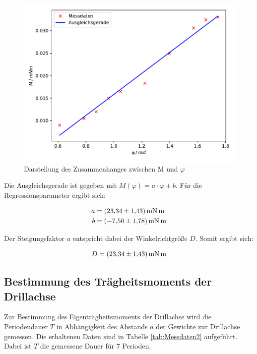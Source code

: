 \begin{figure}
  \centering
  \includegraphics[scale=0.8]{content/plot1.pdf}
  \caption{Darstellung des Zusammenhanges zwischen M und $\varphi$}
  \label{fig:plot1}
\end{figure}

Die Ausgleichsgerade ist gegeben mit $M(\varphi) = a\cdot \varphi + b$. Für die Regressionsparameter
ergibt sich: 

\begin{align*}
a &= \SI{23.34+-1.43}{\milli\newton\meter} \\
b &= \SI{-7.5+-1.78}{\milli\newton\meter}
\end{align*}

Der Steigungsfaktor $a$ entspricht dabei der Winkelrichtgröße $D$. Somit ergibt sich: 

\begin{equation*}
D = \SI{23.34+-1.43}{\milli\newton\meter}
\end{equation*}

\subsection{Bestimmung des Trägheitsmoments der Drillachse}

Zur Bestimmung des Eigenträgheitsmoments der Drillachse wird die Periodendauer $T$ in Abhängigkeit 
des Abstands $a$ der Gewichte zur Drillachse gemessen. Die erhaltenen Daten sind in Tabelle 
\ref{tab:Messdaten2} aufgeführt. Dabei ist $T$ die gemessene Dauer für 7 Perioden.

